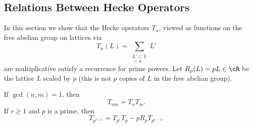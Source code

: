 \documentclass{report}
\begin{document}

\subsection{Relations Between Hecke Operators}\label{sec:heckerel}
In this section we show that the Hecke operators $T_n$, viewed as
functions on the free abelian group on lattices via
$$
 T_n(L)= \sum_{\substack{L'\subset L\\ [L:L']=n}} L'
$$
are multiplicative  satisfy a recurrence for prime powers.
Let $R_p(L) = pL\in \cR$ be the lattice $L$ scaled by $p$ (this is
not $p$ copies of $L$ in the free abelian group).

\begin{proposition}\label{prop:heckerel}
If $\gcd(n,m)=1$, then
\begin{equation}\label{eqn:heckemult}
T_{nm} = T_n T_m.
\end{equation}
If $r\geq 1$ and $p$ is a prime, then
\begin{equation}\label{eqn:heckepolyp}
   T_{p^{r+1}} = T_{p^r} T_p  - p R_p T_{p^{r-1}}.
\end{equation}
\end{proposition}
\end{document}
